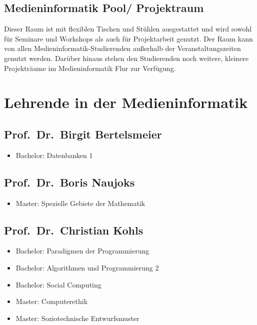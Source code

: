 \subsection{Medieninformatik Pool/
Projektraum}\label{medieninformatik-pool-projektraum}

Dieser Raum ist mit flexiblen Tischen und Stühlen ausgestattet und wird
sowohl für Seminare und Workshops als auch für Projektarbeit genutzt.
Der Raum kann von allen Medieninformatik-Studierenden außerhalb der
Veranstaltungszeiten genutzt werden. Darüber hinaus stehen den
Studierenden noch weitere, kleinere Projekträume im Medieninformatik
Flur zur Verfügung.

\section{Lehrende in der
Medieninformatik}\label{lehrende-in-der-medieninformatik}

\subsection{Prof.~Dr.~Birgit
Bertelsmeier}\label{prof.dr.birgit-bertelsmeier}

\begin{itemize}
\tightlist
\item
  Bachelor: Datenbanken 1
\end{itemize}

\subsection{Prof.~Dr.~Boris Naujoks}\label{prof.dr.boris-naujoks}

\begin{itemize}
\tightlist
\item
  Master: Spezielle Gebiete der Mathematik
\end{itemize}

\subsection{Prof.~Dr.~Christian Kohls}\label{prof.dr.christian-kohls}

\begin{itemize}
\tightlist
\item
  Bachelor: Paradigmen der Programmierung
\item
  Bachelor: Algorithmen und Programmierung 2
\item
  Bachelor: Social Computing
\item
  Master: Computerethik
\item
  Master: Soziotechnische Entwurfsmuster
\end{itemize}

